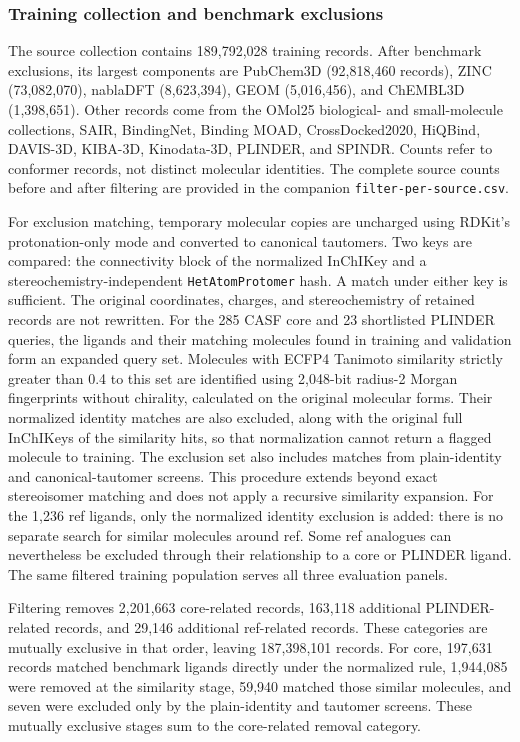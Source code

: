 \subsubsection*{Training collection and benchmark exclusions}

The source collection contains 189,792,028 training records. After benchmark
exclusions, its largest components are PubChem3D (92,818,460 records), ZINC
(73,082,070), nablaDFT (8,623,394), GEOM (5,016,456), and ChEMBL3D (1,398,651).
Other records come from the OMol25 biological- and small-molecule collections,
SAIR, BindingNet, Binding MOAD, CrossDocked2020, HiQBind, DAVIS-3D, KIBA-3D,
Kinodata-3D, PLINDER, and SPINDR. Counts refer to conformer records, not distinct
molecular identities. The complete source counts before and after filtering are
provided in the companion \texttt{filter-per-source.csv}.

For exclusion matching, temporary molecular copies are uncharged using RDKit's
protonation-only mode and converted to canonical tautomers. Two keys are compared:
the connectivity block of the normalized InChIKey and a stereochemistry-independent
\texttt{HetAtomProtomer} hash. A match under either key is sufficient. The original
coordinates, charges, and stereochemistry of retained records are not rewritten.
For the 285 CASF core and 23 shortlisted PLINDER queries, the ligands and their matching
molecules found in training and validation form an expanded query set. Molecules with
ECFP4 Tanimoto similarity strictly greater than 0.4 to this set are identified using 2,048-bit radius-2 Morgan fingerprints
without chirality, calculated on the original molecular forms. Their normalized
identity matches are also excluded, along with the original full InChIKeys of the
similarity hits, so that normalization cannot return a flagged molecule to training.
The exclusion set also includes matches from plain-identity and canonical-tautomer
screens. This procedure extends
beyond exact stereoisomer matching and does not apply a recursive similarity expansion.
For the 1,236 ref ligands, only the normalized identity exclusion is added: there is
no separate search for similar molecules around ref. Some ref analogues can nevertheless
be excluded through their relationship to a core or PLINDER ligand. The same filtered
training population serves all three evaluation panels.

Filtering removes 2,201,663 core-related records, 163,118 additional PLINDER-related
records, and 29,146 additional ref-related records. These
categories are mutually exclusive in that order, leaving 187,398,101 records.
For core, 197,631 records matched benchmark ligands directly under the normalized
rule, 1,944,085 were removed at the similarity stage, 59,940 matched those similar
molecules, and seven were excluded only by the plain-identity and tautomer screens.
These mutually exclusive stages sum to the core-related removal category.


